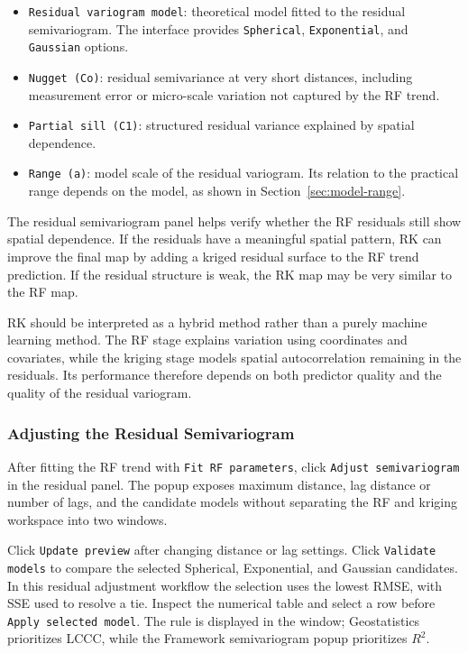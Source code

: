 \documentclass[11pt,a4paper]{article}
\begin{document}
\begin{itemize}
    \item \texttt{Residual variogram model}: theoretical model fitted to the residual semivariogram. The interface provides \texttt{Spherical}, \texttt{Exponential}, and \texttt{Gaussian} options.


    \item \texttt{Nugget (Co)}: residual semivariance at very short distances, including measurement error or micro-scale variation not captured by the RF trend.


    \item \texttt{Partial sill (C1)}: structured residual variance explained by spatial dependence.


    \item \texttt{Range (a)}: model scale of the residual variogram. Its relation to the practical range depends on the model, as shown in Section~\ref{sec:model-range}.
\end{itemize}


The residual semivariogram panel helps verify whether the RF residuals still show spatial dependence. If the residuals have a meaningful spatial pattern, RK can improve the final map by adding a kriged residual surface to the RF trend prediction. If the residual structure is weak, the RK map may be very similar to the RF map.


\begin{infobox}
RK should be interpreted as a hybrid method rather than a purely machine learning method. The RF stage explains variation using coordinates and covariates, while the kriging stage models spatial autocorrelation remaining in the residuals. Its performance therefore depends on both predictor quality and the quality of the residual variogram.
\end{infobox}



\subsubsection{Adjusting the Residual Semivariogram}

After fitting the RF trend with \texttt{Fit RF parameters}, click \texttt{Adjust semivariogram} in the residual panel. The popup exposes maximum distance, lag distance or number of lags, and the candidate models without separating the RF and kriging workspace into two windows.

Click \texttt{Update preview} after changing distance or lag settings. Click \texttt{Validate models} to compare the selected Spherical, Exponential, and Gaussian candidates. In this residual adjustment workflow the selection uses the lowest RMSE, with SSE used to resolve a tie. Inspect the numerical table and select a row before \texttt{Apply selected model}. The rule is displayed in the window; Geostatistics prioritizes LCCC, while the Framework semivariogram popup prioritizes $R^2$.
\end{document}
